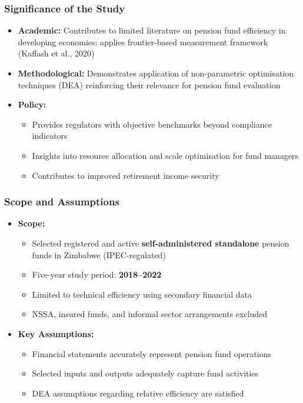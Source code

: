 \documentclass{beamer}
\begin{document}
\begin{frame}
    \frametitle{Significance of the Study}
    \begin{itemize}
        \item \textbf{Academic:} Contributes to limited literature on pension fund efficiency in developing economies; applies frontier-based measurement framework (Kaffash et al., 2020)
        \item \textbf{Methodological:} Demonstrates application of non-parametric optimisation techniques (DEA) reinforcing their relevance for pension fund evaluation
        \item \textbf{Policy:}
        \begin{itemize}
            \item Provides regulators with objective benchmarks beyond compliance indicators
            \item Insights into resource allocation and scale optimisation for fund managers
            \item Contributes to improved retirement income security
        \end{itemize}
    \end{itemize}
\end{frame}

\begin{frame}
    \frametitle{Scope and Assumptions}
    \begin{itemize}
        \item \textbf{Scope:}
        \begin{itemize}
            \item Selected registered and active \textbf{self-administered standalone} pension funds in Zimbabwe (IPEC-regulated)
            \item Five-year study period: \textbf{2018--2022}
            \item Limited to technical efficiency using secondary financial data
            \item NSSA, insured funds, and informal sector arrangements excluded
        \end{itemize}
        \item \textbf{Key Assumptions:}
        \begin{itemize}
            \item Financial statements accurately represent pension fund operations
            \item Selected inputs and outputs adequately capture fund activities
            \item DEA assumptions regarding relative efficiency are satisfied
        \end{itemize}
    \end{itemize}
\end{frame}
\end{document}
